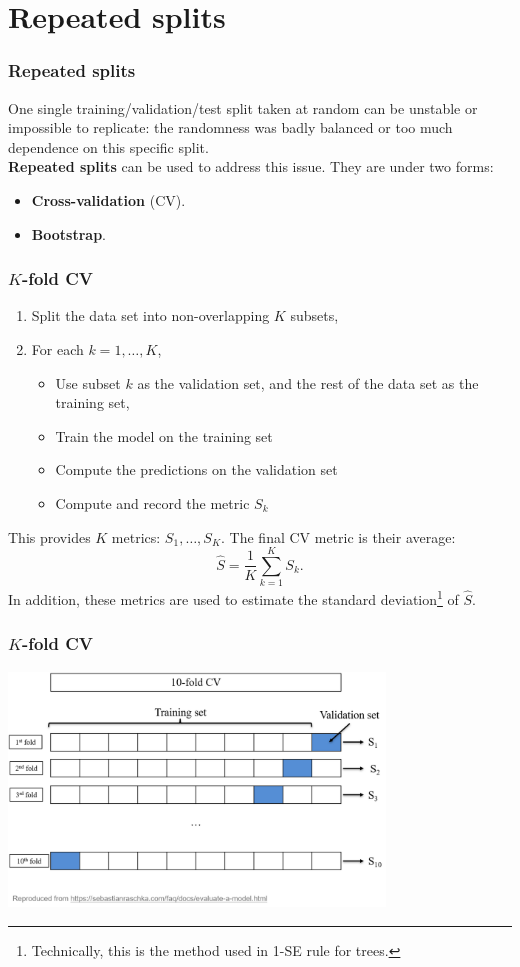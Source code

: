 \section{Repeated splits}
\begin{frame}
\frametitle{Repeated splits}
One single training/validation/test split taken at random can be unstable or impossible to replicate: the randomness was badly balanced or too much dependence on this specific split.\\ 
\vspace{0.3cm}
{\bf Repeated splits} can be used to address this issue. They are under two forms:
\begin{itemize}
\item {\bf Cross-validation} (CV).
\item {\bf Bootstrap}.
\end{itemize}
\end{frame}
\begin{frame}
\frametitle{$K$-fold CV}
\begin{enumerate}
\item Split the data set into non-overlapping $K$ subsets, 
\item For each $k=1,\ldots,K$, 
\begin{itemize}
\item Use subset $k$ as the validation set, and the rest of the data set as the training set,
\item Train the model on the training set
\item Compute the predictions on the validation set
\item Compute and record the metric $S_k$ 
\end{itemize}
\end{enumerate}
This provides $K$ metrics: $S_1, \ldots, S_K$. The final CV metric is their average:
$$
\hat{S} = \frac{1}{K}\sum_{k=1}^K S_k.
$$
In addition, these metrics are used to estimate the standard deviation\footnote{Technically, this is the method used in 1-SE rule for trees.} of $\hat{S}$. 
\end{frame}
\begin{frame}
\frametitle{$K$-fold CV}
\begin{center}
\includegraphics[width=10cm]{../Graphs/10-CV.png}
\end{center}
\end{frame}
